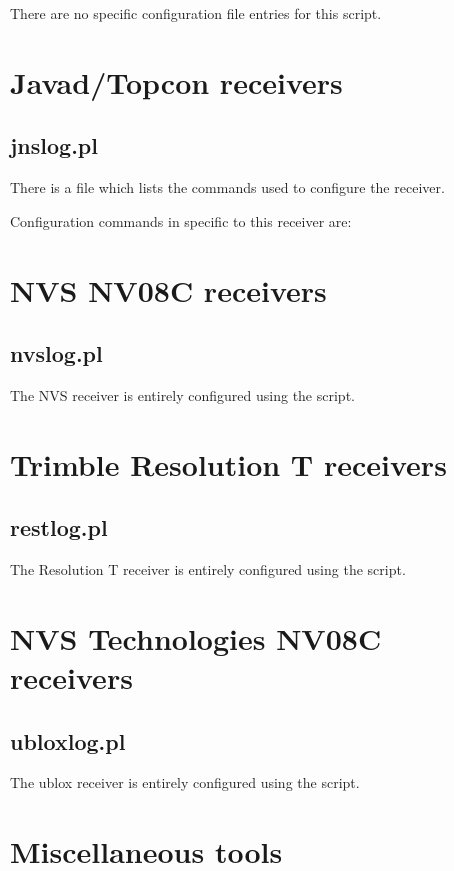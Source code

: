 There are no specific configuration file entries for this script.

\section{Javad/Topcon receivers}

\subsection{jnslog.pl}
\hypertarget{h:jnslog}{}
There is a file  which lists the commands used to configure the receiver.

Configuration commands in  specific to this receiver are:

\section{NVS NV08C receivers}
\subsection{nvslog.pl}
\hypertarget{h:nvslog}{}

The NVS receiver is entirely configured using the script.

\section{Trimble Resolution T receivers}
\subsection{restlog.pl}
\hypertarget{h:restlog}{}

The Resolution T receiver is entirely configured using the script.

\section{NVS Technologies NV08C receivers}

\subsection{ubloxlog.pl}
\hypertarget{h:ubloxlog}{}

The ublox receiver is entirely configured using the script.



\section{Miscellaneous tools}

